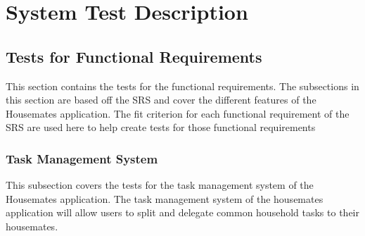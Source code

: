 \documentclass[12pt, titlepage]{article}
\begin{document}
\section{System Test Description}
	
\subsection{Tests for Functional Requirements}

This section contains the tests for the functional requirements. The subsections in this section are based off the SRS and cover the different features of the Housemates application. The fit criterion for each functional requirement of the SRS are used here to help create tests for those functional requirements



\subsubsection{Task Management System}

This subsection covers the tests for the task management system of the Housemates application. The task management system of the housemates application will allow users to split and delegate common household tasks to their housemates.

\end{document}
